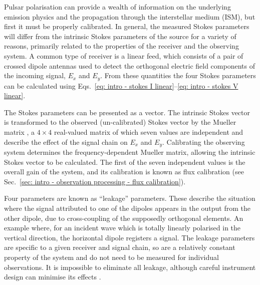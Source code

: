 Pulsar polarisation can provide a wealth of information on the underlying emission physics and the propagation through the interstellar medium (ISM), but first it must be properly calibrated. In general, the measured Stokes parameters will differ from the intrinsic Stokes parameters of the source for a variety of reasons, primarily related to the properties of the receiver and the observing system. A common type of receiver is a linear feed, which consists of a pair of crossed dipole antennas used to detect the orthogonal electric field components of the incoming signal, $E_x$ and $E_y$. From these quantities the four Stokes parameters can be calculated using Eqs.~\eqref{eq: intro - stokes I linear}--\eqref{eq: intro - stokes V linear}.

The Stokes parameters can be presented as a vector. The intrinsic Stokes vector is transformed to the observed (un-calibrated) Stokes vector by the Mueller matrix \citep{Mxxx1948}, a $4\times4$ real-valued matrix of which seven values are independent and describe the effect of the signal chain on $E_x$ and $E_y$. Calibrating the observing system determines the frequency-dependent Mueller matrix, allowing the intrinsic Stokes vector to be calculated. The first of the seven independent values is the overall gain of the system, and its calibration is known as flux calibration (see Sec.~\ref{sec: intro - observation processing - flux calibration}).

Four parameters are known as ``leakage'' parameters. These describe the situation where the signal attributed to one of the dipoles appears in the output from the other dipole, due to cross-coupling of the supposedly orthogonal elements. An example where, for an incident wave which is totally linearly polarised in the vertical direction, the horizontal dipole registers a signal. The leakage parameters are specific to a given receiver and signal chain, so are a relatively constant property of the system and do not need to be measured for individual observations. It is impossible to eliminate all leakage, although careful instrument design can minimise its effects \citep[e.g.][]{RTxx2018}. 

